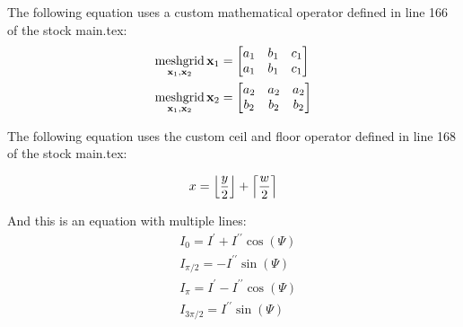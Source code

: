 The following equation uses a custom mathematical operator defined in line 166 of the stock main.tex:
\begin{equation}
\begin{aligned}
			\meshgrid_{\mathbf{x}_{1},\mathbf{x}_{2}}\mathbf{x}_{1}&=\begin{bmatrix}a_{1} & b_{1} & c_{1}\\
a_{1} & b_{1} & c_{1}
\end{bmatrix}\\
			\meshgrid_{\mathbf{x}_{1},\mathbf{x}_{2}}\mathbf{x}_{2}&=\begin{bmatrix}a_{2} & a_{2} & a_{2}\\
b_{2} & b_{2} & b_{2}
\end{bmatrix}
\end{aligned}
\end{equation}

The following equation uses the custom ceil and floor operator defined in line 168 of the stock main.tex:

\begin{equation}
x = \floor*{\frac{y}{2}} + \ceil*{\frac{w}{2}}
\end{equation}


And this is an equation with multiple lines:
\begin{equation}
\begin{aligned}
&I_{0}=I^{\prime}+I^{\prime\prime}\cos(\varPsi)   \\
&I_{\pi/2}=-I^{\prime\prime}\sin(\varPsi)                \\
&I_{\pi}=I^{\prime}-I^{\prime\prime}\cos(\varPsi)   \\
&I_{3\pi/2}=I^{\prime\prime}\sin(\varPsi)
\end{aligned}
\end{equation}

